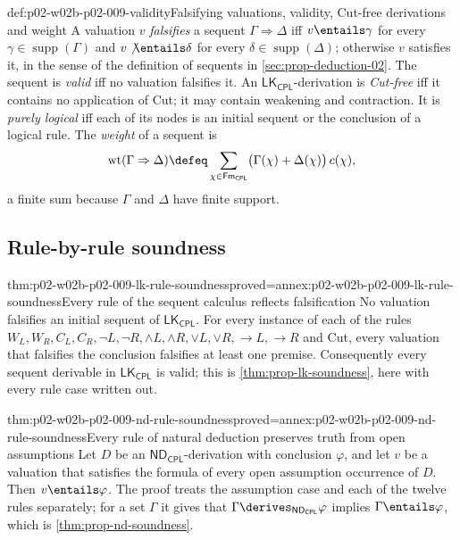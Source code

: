 \begin{hbdefinition}{def:p02-w02b-p02-009-validity}{Falsifying valuations, validity, Cut-free derivations and weight}
A valuation \(v\) \emph{falsifies} a sequent \(\Gamma\Rightarrow\Delta\) iff
\(v\entails\gamma\) for every \(\gamma\in\operatorname{supp}(\Gamma)\) and
\(v\not\entails\delta\) for every \(\delta\in\operatorname{supp}(\Delta)\);
otherwise \(v\) satisfies it, in the sense of the definition of sequents in
\cref{sec:prop-deduction-02}.  The sequent is \emph{valid} iff no valuation
falsifies it.  An \(\mathsf{LK}_{\mathsf{CPL}}\)-derivation is
\emph{Cut-free} iff it contains no application of Cut; it may contain
weakening and contraction.  It is \emph{purely logical} iff each of its nodes
is an initial sequent or the conclusion of a logical rule.  The
\emph{weight} of a sequent is
\[
 \operatorname{wt}(\Gamma\Rightarrow\Delta)\defeq
 \sum_{\chi\in\mathsf{Fm}_{\mathsf{CPL}}}
 \bigl(\Gamma(\chi)+\Delta(\chi)\bigr)\,c(\chi),
\]
a finite sum because \(\Gamma\) and \(\Delta\) have finite support.
\end{hbdefinition}

\subsection{Rule-by-rule soundness}

\begin{hblemma}{thm:p02-w02b-p02-009-lk-rule-soundness}{proved=annex:p02-w02b-p02-009-lk-rule-soundness}{Every rule of the sequent calculus reflects falsification}
No valuation falsifies an initial sequent of
\(\mathsf{LK}_{\mathsf{CPL}}\).  For every instance of each of the rules
\(W_L,W_R,C_L,C_R,\neg L,\neg R,\land L,\land R,\lor L,\lor R,\to L,\to R\)
and Cut, every valuation that falsifies the conclusion falsifies at least one
premise.  Consequently every sequent derivable in
\(\mathsf{LK}_{\mathsf{CPL}}\) is valid; this is
\cref{thm:prop-lk-soundness}, here with every rule case written out.
\end{hblemma}

\begin{hblemma}{thm:p02-w02b-p02-009-nd-rule-soundness}{proved=annex:p02-w02b-p02-009-nd-rule-soundness}{Every rule of natural deduction preserves truth from open assumptions}
Let \(D\) be an \(\mathsf{ND}_{\mathsf{CPL}}\)-derivation with conclusion
\(\varphi\), and let \(v\) be a valuation that satisfies the formula of
every open assumption occurrence of \(D\).  Then \(v\entails\varphi\).  The
proof treats the assumption case and each of the twelve rules separately;
for a set \(\Gamma\) it gives
that \(\Gamma\derives_{\mathsf{ND}_{\mathsf{CPL}}}\varphi\) implies
\(\Gamma\entails\varphi\), which is \cref{thm:prop-nd-soundness}.
\end{hblemma}

